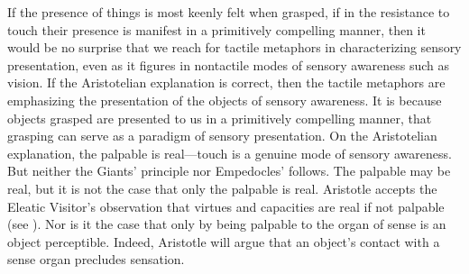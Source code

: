 If the presence of things is most keenly felt when grasped, if in the resistance to touch their presence is manifest in a primitively compelling manner, then it would be no surprise that we reach for tactile metaphors in characterizing sensory presentation, even as it figures in nontactile modes of sensory awareness such as vision. If the Aristotelian explanation is correct, then the tactile metaphors are emphasizing the presentation of the objects of sensory awareness. It is because objects grasped are presented to us in a primitively compelling manner, that grasping can serve as a paradigm of sensory presentation. On the Aristotelian explanation, the palpable is real---touch is a genuine mode of sensory awareness. But neither the Giants' principle nor Empedocles' follows. The palpable may be real, but it is not the case that only the palpable is real. Aristotle accepts the Eleatic Visitor's observation that virtues and capacities are real if not palpable (see \citealt[chapter 1]{Beere:2009vn}). Nor is it the case that only by being palpable to the organ of sense is an object perceptible. Indeed, Aristotle will argue that an object's contact with a sense organ precludes sensation.

